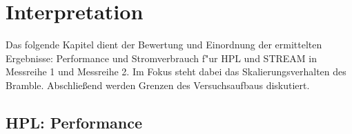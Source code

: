 \chapter{Interpretation}\label{Kap4}

Das folgende Kapitel dient der Bewertung und Einordnung der ermittelten Ergebnisse: Performance und Stromverbrauch f"ur HPL und STREAM in Messreihe 1 und Messreihe 2. Im Fokus steht dabei das Skalierungsverhalten des Bramble. Abschlie\ss end werden Grenzen des Versuchsaufbaus diskutiert.   

\section{HPL: Performance}\label{Interpretation-Linpack}


